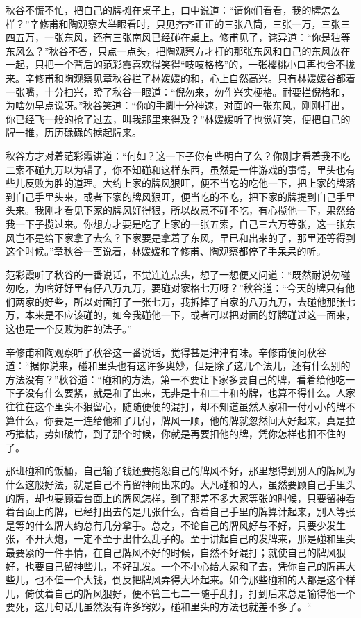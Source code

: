 \documentclass[12pt,UTF8]{ctexbook}
\begin{document}
{{{秋谷不慌不忙，把自己的牌摊在桌子上，口中说道：“请你们看看，我的牌怎么样？”辛修甫和陶观察大举眼看时，只见齐齐正正的三张八筒，三张一万，三张三四五万，一张东风，还有三张南风已经碰在桌上。修甫见了，诧异道：“你是独等东风么？”秋谷不答，只点一点头，把陶观察方才打的那张东风和自己的东风放在一起，只把一个背后的范彩霞喜欢得笑得“吱吱格格”的，一张樱桃小口再也合不拢来。辛修甫和陶观察见章秋谷拦了林媛媛的和，心上自然高兴。只有林媛媛谷都着一张嘴，十分扫兴，瞪了秋谷一眼道：“倪勿来，勿作兴实梗格。耐要拦倪格和，为啥勿早点说呀。”秋谷笑道：“你的手脚十分神速，对面的一张东风，刚刚打出，你已经飞一般的抢了过去，叫我那里来得及？”林媛媛听了也觉好笑，便把自己的牌一推，历历碌碌的掳起牌来。

秋谷方才对着范彩霞讲道：“何如？这一下子你有些明白了么？你刚才看着我不吃二索不碰九万以为错了，你不知碰和这样东西，虽然是一件游戏的事情，里头也有些儿反败为胜的道理。大约上家的牌风狠旺，便不当吃的吃他一下，把上家的牌落到自己手里头来，或者下家的牌风狠旺，便当吃的不吃，把下家的牌提到自己手里头来。我刚才看见下家的牌风好得狠，所以故意不碰不吃，有心揽他一下，果然给我一下子揽过来。你想方才要是吃了上家的一张五索，自己三六万等张，这一张东风岂不是给下家拿了去么？下家要是拿着了东风，早已和出来的了，那里还等得到这个时候。”章秋谷一面说着，林媛媛和辛修甫、陶观察都停了手呆呆的听。

范彩霞听了秋谷的一番说话，不觉连连点头，想了一想便又问道：“既然耐说勿碰勿吃，为啥好好里有仔八万九万，要碰对家格七万呀？”秋谷道：“今天的牌只有他们两家的好些，所以对面打了一张七万，我拆掉了自家的八万九万，去碰他那张七万，本来是不应该碰的，如今我碰他一下，或者可以把对面的好牌碰过这一面来，这也是一个反败为胜的法子。”

辛修甫和陶观察听了秋谷这一番说话，觉得甚是津津有味。辛修甫便问秋谷道：“据你说来，碰和里头也有这许多奥妙，但是除了这几个法儿，还有什么别的方法没有？”秋谷道：“碰和的方法，第一不要让下家多要自己的牌，看着给他吃一下子没有什么要紧，就是和了出来，无非是十和二十和的牌，也算不得什么。人家往往在这个里头不狠留心，随随便便的混打，却不知道虽然人家和一付小小的牌不算什么，你要是一连给他和了几付，牌风一顺，他的牌就忽然间大好起来，真是拉朽摧枯，势如破竹，到了那个时候，你就是再要扣他的牌，凭你怎样也扣不住的了。

那班碰和的饭桶，自己输了钱还要抱怨自己的牌风不好，那里想得到别人的牌风为什么这般好法，就是自己不肯留神闹出来的。大凡碰和的人，虽然要顾自己手里头的牌，却也要顾着台面上的牌风怎样，到了那差不多大家等张的时候，只要留神看着台面上的牌，已经打出去的是几张什么，合着自己手里的牌算计起来，别人等张是等的什么牌大约总有几分拿手。总之，不论自己的牌风好与不好，只要少发生张，不开大炮，一定不至于出什么乱子的。至于讲起自己的发牌来，那是碰和里头最要紧的一件事情，在自己牌风不好的时候，自然不好混打；就使自己的牌风狠好，也要自己留神些儿，不好乱发。一个不小心给人家和了去，凭你自己的牌再大些儿，也不值一个大钱，倒反把牌风弄得大坏起来。如今那些碰和的人都是这个样儿，倚仗着自己的牌风狠好，便不管三七二一随手乱打，打到后来总是输得他一个要死，这几句话儿虽然没有许多窍妙，碰和里头的方法也就差不多了。“

}}}
\end{document}
